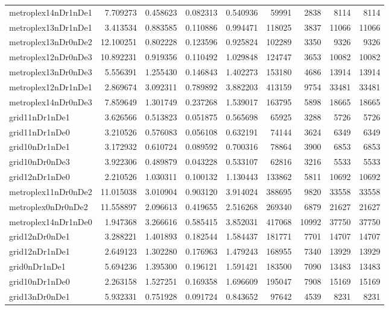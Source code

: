 \begin{longtable}{|l|r|r|r|r|r|r|r|r|}
metroplex14nDr1nDe1 & 7.709273 & 0.458623 & 0.082313 & 0.540936 & 59991 & 2838 & 8114 & 8114 \\
metroplex13nDr1nDe1 & 3.413534 & 0.883585 & 0.110886 & 0.994471 & 118025 & 3837 & 11066 & 11066 \\
metroplex13nDr0nDe2 & 12.100251 & 0.802228 & 0.123596 & 0.925824 & 102289 & 3350 & 9326 & 9326 \\
metroplex12nDr0nDe3 & 10.892231 & 0.919356 & 0.110492 & 1.029848 & 124747 & 3653 & 10082 & 10082 \\
metroplex13nDr0nDe3 & 5.556391 & 1.255430 & 0.146843 & 1.402273 & 153180 & 4686 & 13914 & 13914 \\
metroplex12nDr1nDe1 & 2.869674 & 3.092311 & 0.789892 & 3.882203 & 413159 & 9754 & 33481 & 33481 \\
metroplex14nDr0nDe3 & 7.859649 & 1.301749 & 0.237268 & 1.539017 & 163795 & 5898 & 18665 & 18665 \\
grid11nDr1nDe1 & 3.626566 & 0.513823 & 0.051875 & 0.565698 & 65925 & 3288 & 5726 & 5726 \\
grid11nDr1nDe0 & 3.210526 & 0.576083 & 0.056108 & 0.632191 & 74144 & 3624 & 6349 & 6349 \\
grid10nDr1nDe1 & 3.172932 & 0.610724 & 0.089592 & 0.700316 & 78864 & 3900 & 6853 & 6853 \\
grid10nDr0nDe3 & 3.922306 & 0.489879 & 0.043228 & 0.533107 & 62816 & 3216 & 5533 & 5533 \\
grid12nDr1nDe0 & 2.210526 & 1.030311 & 0.100132 & 1.130443 & 133862 & 5811 & 10692 & 10692 \\
metroplex11nDr0nDe2 & 11.015038 & 3.010904 & 0.903120 & 3.914024 & 388695 & 9820 & 33558 & 33558 \\
metroplex0nDr0nDe2 & 11.558897 & 2.096613 & 0.419655 & 2.516268 & 269340 & 6879 & 21627 & 21627 \\
metroplex14nDr1nDe0 & 1.947368 & 3.266616 & 0.585415 & 3.852031 & 417068 & 10992 & 37750 & 37750 \\
grid12nDr0nDe1 & 3.288221 & 1.401893 & 0.182544 & 1.584437 & 181771 & 7701 & 14707 & 14707 \\
grid12nDr1nDe1 & 2.649123 & 1.302280 & 0.176963 & 1.479243 & 168955 & 7340 & 13929 & 13929 \\
grid0nDr1nDe1 & 5.694236 & 1.395300 & 0.196121 & 1.591421 & 183500 & 7090 & 13483 & 13483 \\
grid10nDr1nDe0 & 2.263158 & 1.527251 & 0.169358 & 1.696609 & 195047 & 7908 & 15169 & 15169 \\
grid13nDr0nDe1 & 5.932331 & 0.751928 & 0.091724 & 0.843652 & 97642 & 4539 & 8231 & 8231 \\

\end{longtable}
